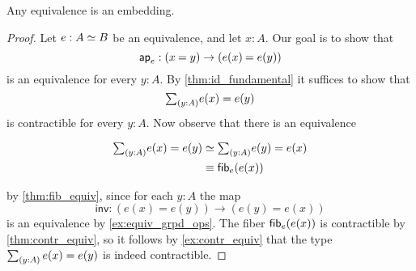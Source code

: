 \begin{thm}
\label{cor:emb_equiv} 
Any equivalence is an embedding.
\end{thm}

\begin{proof}
Let $e:\eqv{A}{B}$ be an equivalence, and let $x:A$. Our goal is to show that
\begin{equation*}
\apfunc{e} : (\id{x}{y})\to (\id{e(x)}{e(y)})
\end{equation*}
is an equivalence for every $y:A$. By \cref{thm:id_fundamental} it suffices to show that 
\begin{equation*}
\sm{y:A}e(x)=e(y)
\end{equation*}
is contractible for every $y:A$. Now observe that there is an equivalence
\begin{samepage}
\begin{align*}
\sm{y:A}e(x)=e(y) & \eqvsym \sm{y:A}e(y)=e(x) \\
& \jdeq \fib{e}{e(x)}
\end{align*}
\end{samepage}
by \cref{thm:fib_equiv}, since for each $y:A$ the map
\begin{equation*}
\mathsf{inv} : (e(x)=e(y))\to (e(y)= e(x))
\end{equation*}
is an equivalence by \cref{ex:equiv_grpd_ops}.
The fiber $\mathsf{fib}_{e}(e(x))$ is contractible by \cref{thm:contr_equiv}, so it follows by \cref{ex:contr_equiv} that the type $\sm{y:A}e(x)=e(y)$ is indeed contractible.
\end{proof}

